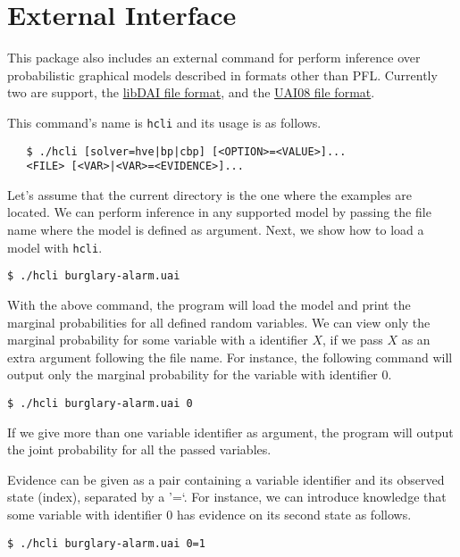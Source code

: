 \documentclass{article}
\begin{document}
\section{External Interface}
This package also includes an external command for perform inference over probabilistic graphical models described in formats other than PFL. Currently two are support, the \href{http://cs.ru.nl/~jorism/libDAI/doc/fileformats.html}{libDAI file format}, and the \href{http://graphmod.ics.uci.edu/uai08/FileFormat}{UAI08 file format}.

This command's name is \texttt{hcli} and its usage is as follows.

\begin{verbatim}
   $ ./hcli [solver=hve|bp|cbp] [<OPTION>=<VALUE>]...
   <FILE> [<VAR>|<VAR>=<EVIDENCE>]...
\end{verbatim}

Let's assume that the current directory is the one where the examples are located. We can perform inference in any supported model by passing the file name where the model is defined as argument. Next, we show how to load a model with \texttt{hcli}.

\texttt{\$ ./hcli burglary-alarm.uai}

With the above command, the program will load the model and print the marginal probabilities for all defined random variables. We can view only the marginal probability for some variable with a identifier $X$, if we pass $X$ as an extra argument following the file name. For instance, the following command will output only the marginal probability for the variable with identifier $0$.

\texttt{\$ ./hcli burglary-alarm.uai 0}

If we give more than one variable identifier as argument, the program will output the joint probability for all the passed variables.

Evidence can be given as a pair containing a variable identifier and its observed state (index), separated by a '=`. For instance, we can introduce knowledge that some variable with identifier $0$ has evidence on its second state as follows.

\texttt{\$ ./hcli burglary-alarm.uai 0=1}
\end{document}
